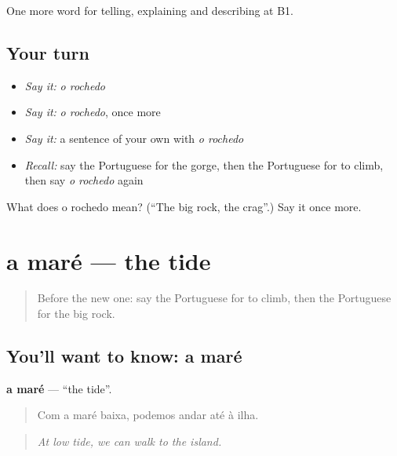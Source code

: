 \begin{grammarlens}[title={What you've built}]
One more word for telling, explaining and describing at B1.
\end{grammarlens}

\subsection*{Your turn}
\begin{itemize}
\raggedright
  \item \emph{Say it:} \emph{o rochedo}
  \item \emph{Say it:} \emph{o rochedo}, once more
  \item \emph{Say it:} a sentence of your own with \emph{o rochedo}
  \item \emph{Recall:} say the Portuguese for the gorge, then the Portuguese for to climb, then say \emph{o rochedo} again
\end{itemize}

\begin{tcolorbox}[breakable,colback=teal!4,colframe=teal!35!black,title={Before you move on}]
What does o rochedo mean? (\textquotedblleft{}The big rock, the crag\textquotedblright{}.) Say it once more.
\end{tcolorbox}
\section[a maré]{a maré — the tide}

\label{lesson:PT-C459-mare}



\begin{quote}
Before the new one: say the Portuguese for to climb, then the Portuguese for the big rock.
\end{quote}

\subsection*{You'll want to know: a maré}
\textbf{a maré} — \textquotedblleft{}the tide\textquotedblright{}.

\begin{quote}
Com a maré baixa, podemos andar até à ilha.
\end{quote}

\begin{quote}
\emph{At low tide, we can walk to the island.}
\end{quote}


